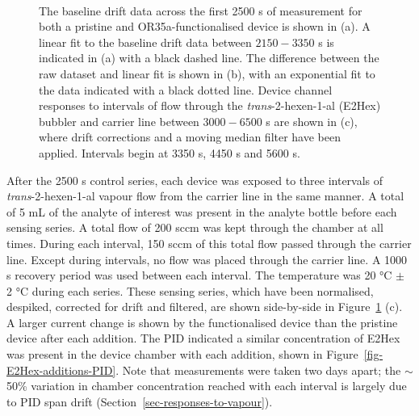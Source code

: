 \documentclass[
  a4paper,
]{scrbook}
\begin{document}
\begin{figure}
\begin{minipage}[t]{0.70\linewidth}
{{}

}

\end{minipage}%
%
\begin{minipage}[t]{0.15\linewidth}

{\centering 

~

}

\end{minipage}%

\caption[The baseline drift data for both a pristine and
OR35a-functionalised device with a linear fitted curve shown, alongside
the same dataset with linear fit subtracted and an exponential curve
fitted. Device channel responses to \emph{trans}-2-hexen-1-al (E2Hex),
filtered and with drift corrections, are also
shown.]{\label{fig-E2Hex-sampling}The baseline drift data across the
first 2500 s of measurement for both a pristine and OR35a-functionalised
device is shown in (a). A linear fit to the baseline drift data between
\(2150-3350\) s is indicated in (a) with a black dashed line. The
difference between the raw dataset and linear fit is shown in (b), with
an exponential fit to the data indicated with a black dotted line.
Device channel responses to intervals of flow through the
\emph{trans}-2-hexen-1-al (E2Hex) bubbler and carrier line between
\(3000-6500\) s are shown in (c), where drift corrections and a moving
median filter have been applied. Intervals begin at 3350 s, 4450 s and
5600 s.}

\end{figure}

After the 2500 s control series, each device was exposed to three
intervals of \emph{trans}-2-hexen-1-al vapour flow from the carrier line
in the same manner. A total of 5 mL of the analyte of interest was
present in the analyte bottle before each sensing series. A total flow
of 200 sccm was kept through the chamber at all times. During each
interval, 150 sccm of this total flow passed through the carrier line.
Except during intervals, no flow was placed through the carrier line. A
1000 s recovery period was used between each interval. The temperature
was 20 °C \(\pm\) 2 °C during each series. These sensing series, which
have been normalised, despiked, corrected for drift and filtered, are
shown side-by-side in Figure~\ref{fig-E2Hex-sampling} (c). A larger
current change is shown by the functionalised device than the pristine
device after each addition. The PID indicated a similar concentration of
E2Hex was present in the device chamber with each addition, shown in
Figure~\ref{fig-E2Hex-additions-PID}. Note that measurements were taken
two days apart; the \(\sim\) 50\% variation in chamber concentration
reached with each interval is largely due to PID span drift
(Section~\ref{sec-responses-to-vapour}).
\end{document}
